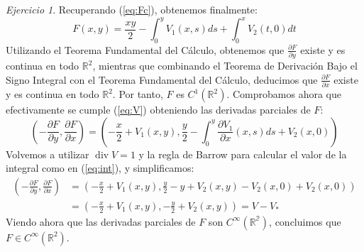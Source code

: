 \documentclass[12pt,spanish]{article}
\theoremstyle{definition}
\theoremstyle{remark}
\newtheorem{exercise}{Ejercicio}
\begin{document}
\begin{exercise}
Recuperando (\ref{eq:Fc}), obtenemos finalmente:
\begin{equation}
  \label{eq:F}
  F(x,y)=\frac{xy}{2}-\int_0^y V_1(x,s)ds+\int_0^x V_2(t,0)dt
\end{equation}
Utilizando el Teorema Fundamental del Cálculo, obtenemos que
$\frac{\partial F}{\partial y}$ existe y es continua en todo
$\mathbb{R}^2$, mientras que combinando el Teorema de Derivación Bajo
el Signo Integral con el Teorema Fundamental del Cálculo, deducimos
que $\frac{\partial F}{\partial x}$ existe y es continua en todo
$\mathbb{R}^2$. Por tanto, $F$ es $C^1(\mathbb{R}^2)$. Comprobamos
ahora que efectivamente se cumple (\ref{eq:V}) obteniendo las derivadas parciales de $F$:
\begin{equation*}
  \left(-\frac{\partial F}{\partial y},\frac{\partial F}{\partial x}\right)=\left(-\frac{x}{2}+V_1(x,y),\frac{y}{2}-\int_0^y \frac{\partial V_1}{\partial x}(x,s)ds+V_2(x,0)\right)
\end{equation*}
Volvemos a utilizar $\operatorname{div}V=1$ y la regla de Barrow para
calcular el valor de la integral como en (\ref{eq:int}), y
simplificamos:
\begin{align*}
  \left(-\frac{\partial F}{\partial y},\frac{\partial F}{\partial x}\right)&=\left(-\frac{x}{2}+V_1(x,y),\frac{y}{2}-y+V_2(x,y)-V_2(x,0)+V_2(x,0)\right) \\
  &=\left(-\frac{x}{2}+V_1(x,y),-\frac{y}{2}+V_2(x,y)\right)=V-V_*
\end{align*}
Viendo ahora que las derivadas parciales de $F$ son
$C^\infty(\mathbb{R^2})$, concluimos que $F\in C^\infty(\mathbb{R}^2)$.
\end{exercise}
\end{document}
